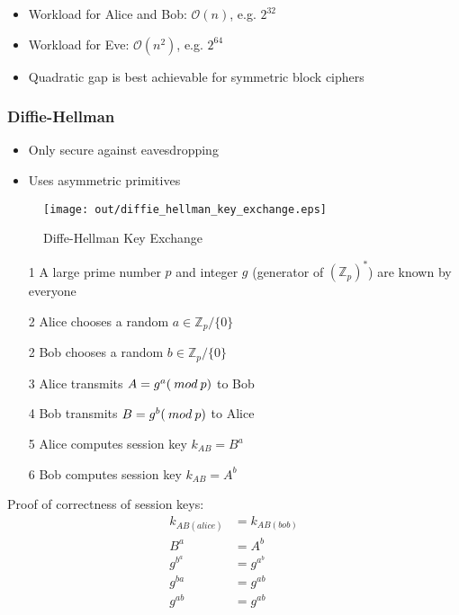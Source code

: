 \documentclass[a4paper]{article}
\begin{document}

\begin{itemize}
  \item Workload for Alice and Bob: $\mathcal{O}(n)$, e.g. $2^{32}$
  \item Workload for Eve: $\mathcal{O}(n^{2})$, e.g. $2^{64}$
  \item Quadratic gap is best achievable for symmetric block ciphers
\end{itemize}

\subsubsection{Diffie-Hellman}

\begin{itemize}
  \item Only secure against eavesdropping
  \item Uses asymmetric primitives
\end{itemize}

\begin{figure}[h!]
  \centering
  \texttt{[image: out/diffie\_hellman\_key\_exchange.eps]}
  \caption{Diffe-Hellman Key Exchange}
  \label{fig:diffe_hellman_key_exchange}
\end{figure}
\FloatBarrier


\begin{enumerate}
  \item[1] A large prime number $p$ and integer $g$ (generator of
           $(\mathbb{Z}_{p})^{*}$) are known by everyone
  \item[2] Alice chooses a random $a \in \mathbb{Z}_{p} / \{0\}$
  \item[2] Bob chooses a random $b \in \mathbb{Z}_{p} / \{0\}$
  \item[3] Alice transmits $A = g^{a} (\: mod \: p)$ to Bob
  \item[4] Bob transmits $B = g^{b} (\: mod \: p)$ to Alice
  \item[5] Alice computes session key $k_{AB} = B^{a}$
  \item[6] Bob computes session key $k_{AB} = A^{b}$
\end{enumerate}


Proof of correctness of session keys:
\begin{align*}
  k_{AB(alice)} &= k_{AB(bob)} \\
  B^{a} &= A^{b} \\
  g^{b^{a}} &= g^{a^{b}} \\
  g^{ba} &= g^{ab} \\
  g^{ab} &= g^{ab}
\end{align*}
\end{document}
